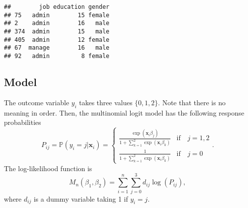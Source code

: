 \documentclass[
  12pt,
]{article}
\newenvironment{Shaded}{\begin{snugshade}}{\end{snugshade}}
\newcommand{\DataTypeTok}[1]{\textcolor[rgb]{0.13,0.29,0.53}{#1}}
\newcommand{\DecValTok}[1]{\textcolor[rgb]{0.00,0.00,0.81}{#1}}
\newcommand{\KeywordTok}[1]{\textcolor[rgb]{0.13,0.29,0.53}{\textbf{#1}}}
\newcommand{\NormalTok}[1]{#1}
\newcommand{\OperatorTok}[1]{\textcolor[rgb]{0.81,0.36,0.00}{\textbf{#1}}}
\newcommand{\OtherTok}[1]{\textcolor[rgb]{0.56,0.35,0.01}{#1}}
\newcommand{\StringTok}[1]{\textcolor[rgb]{0.31,0.60,0.02}{#1}}
\begin{document}
\begin{Shaded}
\end{Shaded}

\begin{verbatim}
##        job education gender
## 75   admin        15 female
## 2    admin        16   male
## 374  admin        15   male
## 405  admin        12 female
## 67  manage        16   male
## 92   admin         8 female
\end{verbatim}

\hypertarget{model-1}{%
\subsection{Model}\label{model-1}}

The outcome variable \(y_i\) takes three values \(\{0, 1, 2\}\). Note
that there is no meaning in order. Then, the multinomial logit model has
the following response probabilities \begin{equation*}
  P_{ij} = \mathbb{P}(y_i = j | \mathbf{x}_i) =
  \begin{cases}
    \frac{\exp(\mathbf{x}_i \beta_j)}{1 + \sum_{k=1}^2 \exp(\mathbf{x}_i \beta_k)} &\text{if}\quad j = 1, 2  \\
    \frac{1}{1 + \sum_{k=1}^2 \exp(\mathbf{x}_i \beta_k)}  &\text{if}\quad j = 0
  \end{cases}.
\end{equation*} The log-likelihood function is \begin{equation*}
  M_n(\beta_1, \beta_2) = \sum_{i=1}^n \sum_{j=0}^3 d_{ij} \log (P_{ij}),
\end{equation*} where \(d_{ij}\) is a dummy variable taking 1 if
\(y_i = j\).
\end{document}

